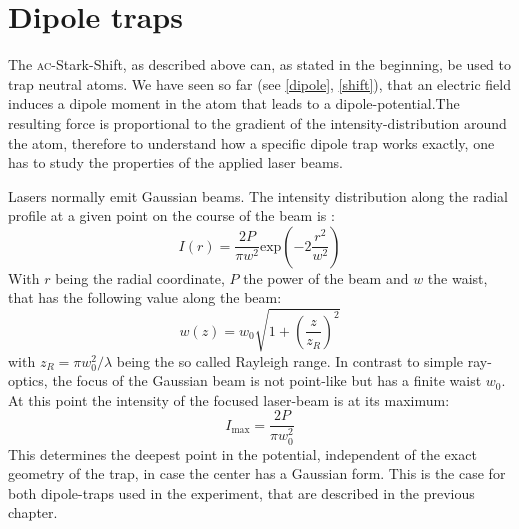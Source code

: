 \section{Dipole traps}
\label{sectiondipole}
The \textsc{ac}-Stark-Shift, as described above can, as stated in the beginning, be used to trap neutral atoms. We have seen so far (see \ref{dipole}, \ref{shift}), that an electric field induces a dipole moment in the atom that leads to a dipole-potential.The resulting force is proportional to the gradient of the intensity-distribution around the atom, therefore to understand how a specific dipole trap works exactly, one has to study the properties of the applied laser beams.

Lasers normally emit Gaussian beams. The intensity distribution along the radial profile at a given point on the course of the beam is \cite{dipole}:
\begin{equation}
I(r)=\frac{2P}{\pi w^2}\mathrm{exp}\left(-2\frac{r^2}{w^2}\right)
\end{equation}
With $r$ being the radial coordinate, $P$ the power of the beam and $w$ the waist, that has the following value along the beam:
\begin{equation}
w(z)=w_0\sqrt{1+\left(\frac{z}{z_R}\right)^2}
\end{equation}
with $z_R=\pi w^2_0/\lambda$ being the so called Rayleigh range. In contrast to simple ray-optics, the focus of the Gaussian beam is not point-like but has a finite waist $w_0$. At this point the intensity of the focused laser-beam is at its maximum:
\begin{equation}
I_{\mathrm{max}}=\frac{2P}{\pi w^2_0}
\end{equation}
This determines the deepest point in the potential, independent of the exact geometry of the trap, in case the center has a Gaussian form. This is the case for both dipole-traps used in the experiment, that are described in the previous chapter.
